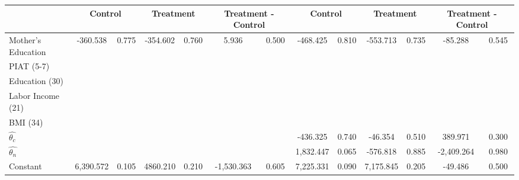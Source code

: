 \begin{tabular}{lcccccccccccc} \toprule
&\multicolumn{2}{c}{Control} & \multicolumn{2}{c}{Treatment} & \multicolumn{2}{c}{Treatment - Control} & \multicolumn{2}{c}{Control} & \multicolumn{2}{c}{Treatment} & \multicolumn{2}{c}{Treatment - Control} \\ \midrule
Mother's Education  &  -360.538 &     0.775 &  -354.602 &     0.760 &     5.936 &     0.500 &  -468.425 &     0.810 &  -553.713 &     0.735 &   -85.288 &     0.545 \\  
PIAT (5-7) &         &         &         &         &         &         &         &         &         &         &         &         \\  
Education (30) &         &         &         &         &         &         &         &         &         &         &         &         \\  
Labor Income (21)  &         &         &         &         &         &         &         &         &         &         &         &         \\  
BMI (34) &         &         &         &         &         &         &         &         &         &         &         &         \\  
$\hat{\theta_{c}}$ &         &         &         &         &         &         &  -436.325 &     0.740 &   -46.354 &     0.510 &   389.971 &     0.300 \\  
$\hat{\theta_{n}}$ &         &         &         &         &         &         &  1,832.447 &     0.065 &  -576.818 &     0.885 & -2,409.264 &     0.980 \\  
Constant &  6,390.572 &     0.105 &  4860.210 &     0.210 & -1,530.363 &     0.605 &  7,225.331 &     0.090 &  7,175.845 &     0.205 &   -49.486 &     0.500 \\ \bottomrule \end{tabular}
